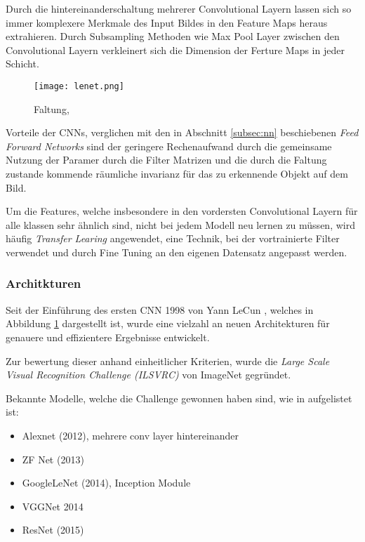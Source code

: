 Durch die hintereinanderschaltung mehrerer Convolutional Layern 
lassen sich so immer komplexere Merkmale des Input Bildes in den 
Feature Maps heraus extrahieren.
Durch Subsampling Methoden wie Max Pool Layer zwischen den Convolutional
Layern verkleinert sich die Dimension der Ferture Maps in jeder Schicht.


\begin{figure}[H]
    \centering
    \label{fig:lenet}
    \texttt{[image: lenet.png]}
    \caption{Faltung, \cite{lecunGradientBasedLearningApplied1998}}
\end{figure}


Vorteile der CNNs, verglichen mit den in Abschnitt \ref{subsec:nn} beschiebenen 
\textit{Feed Forward Networks} sind der geringere Rechenaufwand
durch die gemeinsame Nutzung der Paramer durch die Filter Matrizen und die durch die 
Faltung zustande kommende räumliche invarianz für das zu erkennende 
Objekt auf dem Bild.

Um die Features, welche insbesondere in den vordersten Convolutional 
Layern für alle klassen sehr ähnlich sind, nicht bei jedem Modell
neu lernen zu müssen, wird häufig \textit{Transfer Learing} angewendet, 
eine Technik, bei der vortrainierte Filter verwendet und durch Fine 
Tuning an den eigenen Datensatz angepasst werden.


\subsubsection{Architkturen}\label{subsubsec:architecture}

Seit der Einführung des ersten CNN 1998 von Yann LeCun
\cite{lecunGradientBasedLearningApplied1998}, welches in 
Abbildung \ref{fig:lenet} dargestellt ist, wurde eine 
vielzahl an neuen Architekturen für genauere und effizientere
Ergebnisse entwickelt.

Zur bewertung dieser anhand einheitlicher Kriterien,
wurde die \textit{Large Scale Visual Recognition Challenge (ILSVRC)}
\cite{ImageNetLargeScale} von ImageNet gegründet.

Bekannte Modelle, welche die Challenge gewonnen haben 
sind, wie in \cite{StanfordCS231nConvolutional} aufgelistet ist:


\begin{itemize}
    \item Alexnet (2012), mehrere conv layer hintereinander
    \item ZF Net (2013)
    \item GoogleLeNet (2014), Inception Module
    \item VGGNet 2014
    \item ResNet (2015)
\end{itemize}



